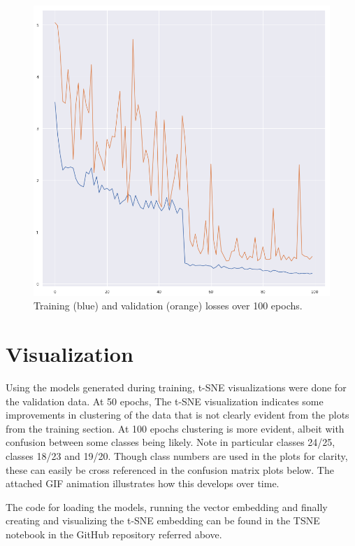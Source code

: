\documentclass[10pt]{article}
\begin{document}
\begin{figure}
\includegraphics[scale=.45]{train_val_loss.png}
\caption{Training (blue) and validation (orange) losses over 100 epochs.}
\end{figure}

\section{Visualization}
Using the models generated during training, t-SNE visualizations were done for the validation data. At 50 epochs, The t-SNE visualization indicates some improvements in clustering of the data that is not clearly evident from the plots from the training section. At 100 epochs clustering is more evident, albeit with confusion between some classes being likely. Note in particular classes 24/25, classes 18/23 and 19/20. Though class numbers are used in the plots for clarity, these can easily be cross referenced in the confusion matrix plots below. The attached GIF animation illustrates how this develops over time.

The code for loading the models, running the vector embedding and finally creating and visualizing the t-SNE embedding can be found in the TSNE notebook in the GitHub repository referred above.
\end{document}
